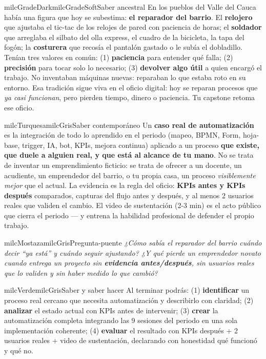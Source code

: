 \documentclass[11pt,letterpaper]{article}
\begin{document}
\begin{softbox}{milcGradeDark}{milcGradeSoft}{Saber ancestral}
En los pueblos del Valle del Cauca había una figura que hoy se subestima: \textbf{el reparador del barrio}. El \textbf{relojero} que ajustaba el tic-tac de los relojes de pared con paciencia de horas; el \textbf{soldador} que arreglaba el silbato del olla express, el cuadro de la bicicleta, la tapa del fogón; la \textbf{costurera} que recosía el pantalón gastado o le subía el dobladillo. Tenían tres valores en común: (1) \textbf{paciencia} para entender qué falla; (2) \textbf{precisión} para tocar solo lo necesario; (3) \textbf{devolver algo útil} a quien encargó el trabajo. No inventaban máquinas nuevas: reparaban lo que estaba roto en su entorno. Esa tradición sigue viva en el oficio digital: hoy se reparan procesos que \emph{ya casi funcionan}, pero pierden tiempo, dinero o paciencia. Tu capstone retoma ese oficio.
\end{softbox}

\begin{softbox}{milcTurquesa}{milcGris}{Saber contemporáneo}
Un \textbf{caso real de automatización} es la integración de todo lo aprendido en el periodo (mapeo, BPMN, Form, hoja-base, trigger, IA, bot, KPIs, mejora continua) aplicado a un proceso \textbf{que existe, que duele a alguien real, y que está al alcance de tu mano}. No se trata de inventar un emprendimiento ficticio: se trata de ofrecer a un docente, un acudiente, un emprendedor del barrio, o tu propia casa, un proceso \emph{visiblemente mejor} que el actual. La evidencia es la regla del oficio: \textbf{KPIs antes y KPIs después} comparados, capturas del flujo antes y después, y al menos 2 usuarios reales que validen el cambio. El video de sustentación (2-3 min) es el acto público que cierra el periodo --- y entrena la habilidad profesional de defender el propio trabajo.
\end{softbox}

\begin{softbox}{milcMostaza}{milcGris}{Pregunta-puente}
\textit{¿Cómo sabía el reparador del barrio cuándo decir \emph{``ya está''} y cuándo seguir ajustando? ¿Y qué pierde un emprendedor novato cuando entrega un proyecto sin \textbf{evidencia antes/después}, sin usuarios reales que lo validen y sin haber medido lo que cambió?}
\end{softbox}

\begin{softbox}{milcVerde}{milcGris}{Saber y saber hacer}
Al terminar podrás: (1) \textbf{identificar} un proceso real cercano que necesita automatización y describirlo con claridad; (2) \textbf{analizar} el estado actual con KPIs antes de intervenir; (3) \textbf{crear} la automatización completa integrando las 9 sesiones del periodo en una sola implementación coherente; (4) \textbf{evaluar} el resultado con KPIs después + 2 usuarios reales + video de sustentación, declarando con honestidad qué funcionó y qué no.
\end{softbox}
\end{document}
